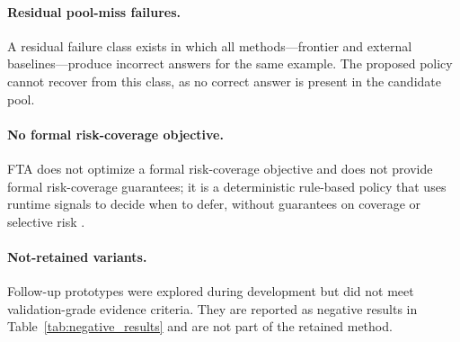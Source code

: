 \paragraph{Residual pool-miss failures.}
A residual failure class exists in which all methods---frontier and external
baselines---produce incorrect answers for the same example.
The proposed policy cannot recover from this class, as no correct answer is
present in the candidate pool.

\paragraph{No formal risk-coverage objective.}
FTA does not optimize a formal risk-coverage objective and does not provide
formal risk-coverage guarantees; it is a deterministic rule-based policy that
uses runtime signals to decide when to defer, without guarantees on coverage or
selective risk \citep{geifman2017selectiveclassificationdeepneural,mozannar2023who}.

\paragraph{Not-retained variants.}
Follow-up prototypes were explored during development but did not meet
validation-grade evidence criteria.
They are reported as negative results in Table~\ref{tab:negative_results} and
are not part of the retained method.
